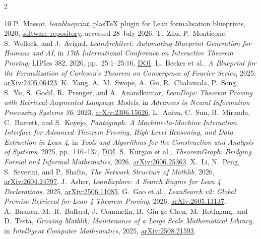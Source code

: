 \documentclass[11pt]{article}
\begin{document}
\clearpage
{\scriptsize
\begin{multicols}{2}
\begin{thebibliography}{10}
\setlength{\itemsep}{0pt}
\setlength{\parsep}{0pt}
 P.~Massot, \emph{leanblueprint}, plasTeX plugin for
Lean formalisation blueprints, 2020,
\href{https://github.com/PatrickMassot/leanblueprint}{software repository},
accessed 28 July 2026.
 T.~Zhu, P.~Monticone, S.~Welleck, and J.~Avigad,
\emph{LeanArchitect: Automating Blueprint Generation for Humans and AI},
in \emph{17th International Conference on Interactive Theorem Proving},
LIPIcs 382, 2026, pp.~25:1--25:16,
\href{https://doi.org/10.4230/LIPIcs.ITP.2026.25}{DOI}.
 L.~Becker et al., \emph{A Blueprint for the Formalization
of Carleson's Theorem on Convergence of Fourier Series}, 2025,
\href{https://doi.org/10.48550/arXiv.2405.06423}{arXiv:2405.06423}.
 K.~Yang, A.~M.~Swope, A.~Gu, R.~Chalamala, P.~Song,
S.~Yu, S.~Godil, R.~Prenger, and A.~Anandkumar, \emph{LeanDojo: Theorem
Proving with Retrieval-Augmented Language Models}, in \emph{Advances in
Neural Information Processing Systems 36}, 2023,
\href{https://doi.org/10.48550/arXiv.2306.15626}{arXiv:2306.15626}.
 L.~Aniva, C.~Sun, B.~Miranda, C.~Barrett, and S.~Koyejo,
\emph{Pantograph: A Machine-to-Machine Interaction Interface for Advanced
Theorem Proving, High Level Reasoning, and Data Extraction in Lean 4}, in
\emph{Tools and Algorithms for the Construction and Analysis of Systems},
2025, pp.~116--137,
\href{https://doi.org/10.1007/978-3-031-90643-5_6}{DOI}.
 S.~Kurgan et al., \emph{TheoremGraph: Bridging Formal
and Informal Mathematics}, 2026,
\href{https://doi.org/10.48550/arXiv.2606.25363}{arXiv:2606.25363}.
 X.~Li, N.~Peng, S.~Severini, and P.~Shafto,
\emph{The Network Structure of Mathlib}, 2026,
\href{https://doi.org/10.48550/arXiv.2604.24797}{arXiv:2604.24797}.
 J.~Asher, \emph{LeanExplore: A Search Engine for Lean 4
Declarations}, 2025,
\href{https://doi.org/10.48550/arXiv.2506.11085}{arXiv:2506.11085}.
 G.~Gao et al., \emph{LeanSearch v2: Global Premise
Retrieval for Lean 4 Theorem Proving}, 2026,
\href{https://doi.org/10.48550/arXiv.2605.13137}{arXiv:2605.13137}.
 A.~Baanen, M.~R.~Ballard, J.~Commelin,
B.~Gin-ge Chen, M.~Rothgang, and D.~Testa, \emph{Growing Mathlib:
Maintenance of a Large Scale Mathematical Library}, in \emph{Intelligent
Computer Mathematics}, 2025,
\href{https://doi.org/10.48550/arXiv.2508.21593}{arXiv:2508.21593}.

\end{thebibliography}
\end{multicols}}
\end{document}
